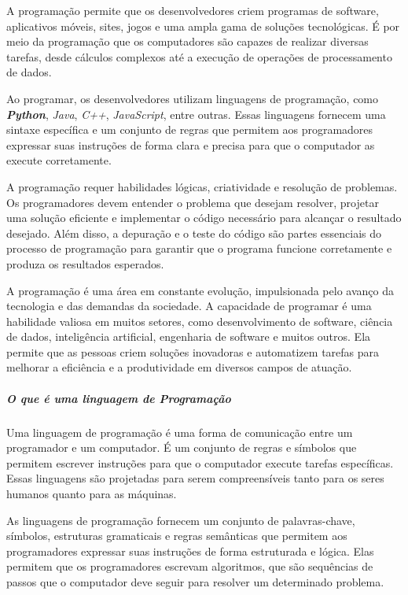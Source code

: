 \documentclass[a4paper, 12pt, onecolumn,singlespacing]{article}
\begin{document}
	A programação permite que os desenvolvedores criem programas de software, aplicativos móveis, sites, jogos e uma ampla gama de soluções tecnológicas. É por meio da programação que os computadores são capazes de realizar diversas tarefas, desde cálculos complexos até a execução de operações de processamento de dados.
	
	Ao programar, os desenvolvedores utilizam linguagens de programação, como \textbf{\textit{Python}}, \textit{Java}, \textit{C++}, \textit{JavaScript}, entre outras. Essas linguagens fornecem uma sintaxe específica e um conjunto de regras que permitem aos programadores expressar suas instruções de forma clara e precisa para que o computador as execute corretamente.
	
	A programação requer habilidades lógicas, criatividade e resolução de problemas. Os programadores devem entender o problema que desejam resolver, projetar uma solução eficiente e implementar o código necessário para alcançar o resultado desejado. Além disso, a depuração e o teste do código são partes essenciais do processo de programação para garantir que o programa funcione corretamente e produza os resultados esperados.
	
	A programação é uma área em constante evolução, impulsionada pelo avanço da tecnologia e das demandas da sociedade. A capacidade de programar é uma habilidade valiosa em muitos setores, como desenvolvimento de software, ciência de dados, inteligência artificial, engenharia de software e muitos outros. Ela permite que as pessoas criem soluções inovadoras e automatizem tarefas para melhorar a eficiência e a produtividade em diversos campos de atuação.
	
	\subparagraph{O que é uma linguagem de Programação} \label{o_que_e_linguagem_de_programacao} Uma linguagem de programação é uma forma de comunicação entre um programador e um computador. É um conjunto de regras e símbolos que permitem escrever instruções para que o computador execute tarefas específicas. Essas linguagens são projetadas para serem compreensíveis tanto para os seres humanos quanto para as máquinas.
	
	As linguagens de programação fornecem um conjunto de palavras-chave, símbolos, estruturas gramaticais e regras semânticas que permitem aos programadores expressar suas instruções de forma estruturada e lógica. Elas permitem que os programadores escrevam algoritmos, que são sequências de passos que o computador deve seguir para resolver um determinado problema.
	
\end{document}
